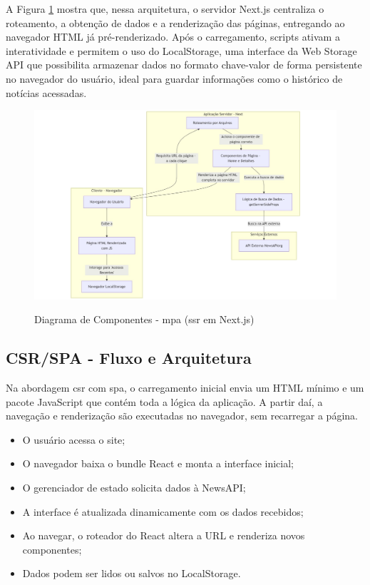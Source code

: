 A Figura \ref{fig:component-diagram-next} mostra que, nessa arquitetura, o servidor Next.js centraliza o roteamento, a obtenção de dados e a renderização das páginas, entregando ao navegador HTML já pré-renderizado. Após o carregamento, scripts ativam a interatividade e permitem o uso do LocalStorage, uma interface da Web Storage API que possibilita armazenar dados no formato chave-valor de forma persistente no navegador do usuário, ideal para guardar informações como o histórico de notícias acessadas.


\begin{figure}[H]
  \centering
  \caption{Diagrama de Componentes - \acrshort{mpa} (\acrshort{ssr} em Next.js)}
  \includegraphics[width=1\textwidth]{media/component-diagram-next.jpeg}
  \label{fig:component-diagram-next}
\end{figure}


\subsection{CSR/SPA - Fluxo e Arquitetura}
\label{subsec:csr-spa}

Na abordagem \acrfull{csr} com \acrfull{spa}, o carregamento inicial envia um HTML mínimo e um pacote JavaScript que contém toda a lógica da aplicação. A partir daí, a navegação e renderização são executadas no navegador, sem recarregar a página.

\begin{itemize}
  \item O usuário acessa o site;
  \item O navegador baixa o bundle React e monta a interface inicial;
  \item O gerenciador de estado solicita dados à NewsAPI;
  \item A interface é atualizada dinamicamente com os dados recebidos;
  \item Ao navegar, o roteador do React altera a URL e renderiza novos componentes;
  \item Dados podem ser lidos ou salvos no LocalStorage.
\end{itemize}

